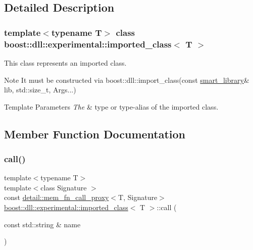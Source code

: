 \subsection{Detailed Description}
\subsubsection*{template$<$typename T$>$\newline
class boost\+::dll\+::experimental\+::imported\+\_\+class$<$ T $>$}

This class represents an imported class.

\begin{DoxyNote}{Note}
It must be constructed via boost\+::dll\+::import\+\_\+class(const \hyperlink{a01712}{smart\+\_\+library}\& lib, std\+::size\+\_\+t, Args...)
\end{DoxyNote}

\begin{DoxyTemplParams}{Template Parameters}
{\em The} & type or type-\/alias of the imported class. \\
\hline
\end{DoxyTemplParams}


\subsection{Member Function Documentation}
\mbox{\label{a01664_a69d3811c5d11899f42327de152536136}} 
\subsubsection{\texorpdfstring{call()}{call()}\hspace{0.1cm}{\footnotesize\ttfamily [1/2]}}
{\footnotesize\ttfamily template$<$typename T$>$ \\
template$<$class Signature $>$ \\
const \hyperlink{a01652}{detail\+::mem\+\_\+fn\+\_\+call\+\_\+proxy}$<$T, Signature$>$ \hyperlink{a01664}{boost\+::dll\+::experimental\+::imported\+\_\+class}$<$ T $>$\+::call (\begin{DoxyParamCaption}\item[{const std\+::string \&}]{name }\end{DoxyParamCaption})\hspace{0.3cm}{\ttfamily [inline]}}

